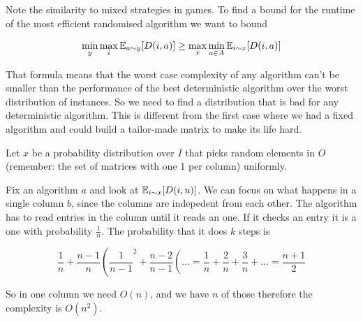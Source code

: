 Note the similarity to mixed strategies in games. To find a bound for the runtime of the most efficient randomised algorithm we want to bound 

\[\min_y \max_i \mathbb{E}_{a\sim y}[D(i,a)] \geq \max_x\min_{a\in A} \mathbb{E}_{i\sim x}[D(i,a)]\]

That formula means that the worst case complexity of any algorithm can't be smaller than the performance of the best deterministic algorithm over the worst distribution of instances. So we need to find a distribution that is bad for any deterministic algorithm. This is different from the first case where we had a fixed algorithm and could build a tailor-made matrix to make its life hard.

Let $x$ be a probability distribution over $I$ that picks random elements in $O$ (remember: the set of matrices with one 1 per column) uniformly.

Fix an algorithm $a$ and look at $\mathbb{E}_{i\sim x}[D(i,u)]$. We can focus on what happens in a single column $b$, since the columns are indepedent from each other. The algorithm has to read entries in the column until it reads an one. If it checks an entry it is a one with probability $\frac{1}{n}$. The probability that it does $k$ steps is

\[\frac{1}{n} + \frac{n-1}{n}\left( \frac{1}{n-1}^2+\frac{n-2}{n-1}\left(\ldots = \frac{1}{n} + \frac 2n + \frac 3n + \right.\right.\ldots= \frac{n+1}{2}\]

So in one column we need $O(n)$, and we have $n$ of those therefore the complexity is $O(n^2)$.

